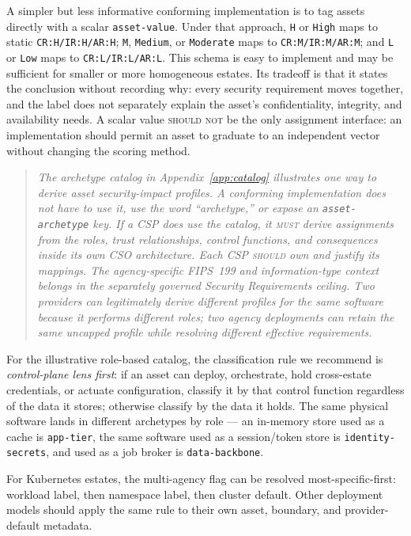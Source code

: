 \documentclass[11pt]{article}
\newcommand{\code}[1]{\texttt{#1}}
\newcommand{\rfckw}[1]{\textsc{#1}}
\begin{document}
A simpler but less informative conforming implementation is to tag assets directly
with a scalar \code{asset-value}. Under that approach,
\code{H} or \code{High} maps to static \code{CR:H/IR:H/AR:H}; \code{M},
\code{Medium}, or \code{Moderate} maps to \code{CR:M/IR:M/AR:M}; and \code{L} or
\code{Low} maps to \code{CR:L/IR:L/AR:L}. This schema is easy to implement and
may be sufficient for smaller or more homogeneous estates. Its tradeoff is that it
states the conclusion without recording why: every security requirement moves
together, and the label does not separately explain the asset's confidentiality,
integrity, and availability needs. A scalar value \rfckw{should not} be the only
assignment interface: an implementation should permit an asset to graduate to an
independent vector without changing the scoring method.


\begin{quote}\itshape
The archetype catalog in Appendix~\ref{app:catalog} illustrates one way to derive
asset security-impact profiles. A conforming implementation does not have to use
it, use the word ``archetype,'' or expose an \code{asset-archetype} key. If a CSP
does use the catalog, it \rfckw{must} derive assignments from the roles, trust
relationships, control functions, and consequences inside its own CSO architecture.
Each CSP \rfckw{should} own and justify its mappings. The agency-specific FIPS~199
and information-type context belongs in the separately governed Security
Requirements ceiling. Two providers can legitimately derive different profiles
for the same software because it performs different roles; two agency deployments
can retain the same uncapped profile while resolving different effective
requirements.
\end{quote}

For the illustrative role-based catalog, the classification rule we recommend is
\emph{control-plane lens first}: if an
asset can deploy, orchestrate, hold cross-estate credentials, or actuate
configuration, classify it by that control function regardless of the data it
stores; otherwise classify by the data it holds. The same physical software lands
in different archetypes by role --- an in-memory store used as a cache is
\code{app-tier}, the same software used as a session/token store is
\code{identity-secrets}, and used as a job broker is \code{data-backbone}.

For Kubernetes estates, the multi-agency flag can be resolved most-specific-first:
workload label, then namespace label, then cluster default. Other deployment
models should apply the same rule to their own asset, boundary, and provider-default
metadata.
\end{document}
